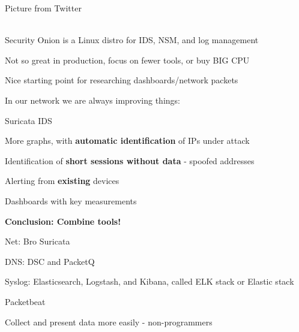 \documentclass[Screen16to9,17pt]{foils}
\begin{document}

Picture from Twitter\\
\\




\begin{list2}
\item Security Onion is a Linux distro for IDS, NSM, and log management
\item {}
\item {}
\item Not so great in production, focus on fewer tools, or buy BIG CPU \smiley
\end{list2}

\centerline{Nice starting point for researching dashboards/network packets}



In our network we are always improving things:
\begin{list1}
\item Suricata IDS 
\item More graphs, with {\bf automatic identification} of IPs under attack
\item Identification of {\bf short sessions without data} - spoofed addresses
\item Alerting from {\bf existing} devices
\item Dashboards with key measurements
\end{list1}

\vskip 2cm
\centerline{\bf\Large Conclusion: Combine tools!}






\begin{list1}
\item Net: Bro  Suricata 
\item DNS: DSC and PacketQ 
\item Syslog: Elasticsearch, Logstash, and Kibana, called ELK stack or Elastic stack
\item Packetbeat 
\end{list1}
\centerline{Collect and present data more easily - non-programmers}
\end{document}
